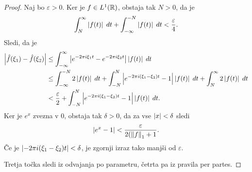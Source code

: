 \begin{proof}
Naj bo $\varepsilon > 0$. Ker je $f \in L^1(\mathbb{R})$, obstaja tak
$N > 0$, da je
\[
\int_N^\infty \left\lvert f(t)\right\rvert\;dt + \int_{-\infty}^{-N} \left\lvert f(t)\right\rvert\;dt
< \frac{\varepsilon}{4}.
\]
Sledi, da je
\begin{align*}
\left\lvert \hat{f}(\xi_1) - \hat{f}(\xi_2)\right\rvert &\leq
\int_{-\infty}^\infty
\left\lvert e^{-2\pi i \xi_1 t} - e^{-2\pi i \xi_2 t}\right\rvert \left\lvert f(t)\right\rvert\;dt
\\
&\leq
\int_{-\infty}^{-N} 2 \left\lvert f(t)\right\rvert\;dt +
\int_{-N}^N \left\lvert e^{-2\pi i (\xi_1-\xi_2) t} - 1\right\rvert \left\lvert f(t)\right\rvert\;dt +
\int_N^\infty 2 \left\lvert f(t)\right\rvert\;dt
\\
&<
\frac{\varepsilon}{2} +
\int_{-N}^N \left\lvert e^{-2\pi i (\xi_1-\xi_2) t} - 1\right\rvert \left\lvert f(t)\right\rvert\;dt.
\end{align*}
Ker je $e^x$ zvezna v $0$, obstaja tak $\delta > 0$, da za vse
$\left\lvert x\right\rvert < \delta$ sledi
\[
\left\lvert e^x - 1\right\rvert < \frac{\varepsilon}{2 (\left\lVert f\right\rVert_1 + 1}.
\]
Če je $\left\lvert -2\pi i (\xi_1-\xi_2) t\right\rvert < \delta$, je zgornji izraz
tako manjši od $\varepsilon$.

Tretja točka sledi iz odvajanja po parametru, četrta pa iz pravila
per partes.


\end{proof}
